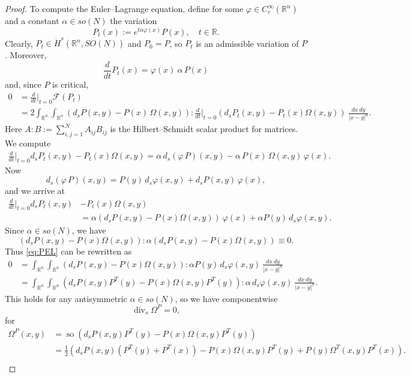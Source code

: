 \documentclass[12pt]{amsart}
\theoremstyle{definition}
\newcommand{\R}{\mathbb{R}}
\newcommand{\brac}[1]{\left (#1 \right )}
\numberwithin{theorem}{section} \numberwithin{equation}{section}
\renewcommand{\div}{\operatorname{div}}
\begin{document}
\begin{proof}
To compute the Euler--Lagrange equation, define for some $\varphi \in C_c^\infty(\R^n)$ and a constant $\alpha \in so(N)$ the variation 
\[
 P_t(x) := e^{t \alpha \varphi(x)} P(x),\quad t \in \R.
\]
Clearly, $P_t \in \dot{H}^s(\R^n,SO(N))$ and $P_0 = P$, so $P_t$ is an admissible variation of $P$. Moreover,
\[
 \frac{d}{dt} P_t(x) = \varphi(x)\ \alpha\, P(x)
\]
and, since $P$ is critical,
\begin{equation}\label{eq:PEL}
\begin{split}
 0 &= \frac{d}{dt} \Big |_{t = 0}  \mathcal{F}(P_t)\\
 &= 2\int_{\R^n}\int_{\R^n} \brac{d_sP(x,y) - P(x)\, \Omega(x,y)}: \frac{d}{dt} \Big|_{t=0}\brac{d_sP_t(x,y) - P_t(x) \Omega(x,y)} \ \frac{dx\ dy}{|x-y|^n}.
\end{split}
 \end{equation}
Here $A:B := \sum_{i,j=1}^N A_{ij}B_{ij}$ is the Hilbert--Schmidt scalar product for matrices. We compute
\[
 \begin{split}
 \frac{d}{dt} \Big|_{t=0} d_sP_t(x,y) - P_t(x) \Omega(x,y)
 =\alpha\, d_s (\varphi\, P)(x,y)-  \alpha\, P(x)\, \Omega(x,y)\, \varphi(x).
 \end{split}
\]
Now
\[
 d_s (\varphi\, P)(x,y)  =  P(y)\, d_s \varphi(x,y)  + d_s P(x,y)\, \varphi(x),
\]
and we arrive at
\[
 \begin{split}
 \frac{d}{dt} \Big|_{t=0} d_s P_t(x,y) &- P_t(x) \Omega(x,y)\\
 &=\alpha \brac{d_s P(x,y) - P(x) \Omega(x,y)}\ \varphi(x) +  \alpha P(y)\, d_s \varphi(x,y).
 \end{split}
\]
Since $\alpha \in so(N)$, we have
\[
 \brac{d_s P(x,y) - P(x) \Omega(x,y)}: \alpha \brac{d_s P(x,y) - P(x) \Omega(x,y)} \equiv 0.
\]
Thus \eqref{eq:PEL} can be rewritten as
\[
\begin{split}
 0 &= \int_{\R^n}\int_{\R^n} \brac{d_sP(x,y) - P(x) \Omega(x,y)}: \alpha P(y)\, d_s \varphi(x,y) \ \frac{dx\ dy}{|x-y|^n}\\
 &= \int_{\R^n}\int_{\R^n} \brac{d_sP(x,y)P^T(y)  - P(x) \Omega(x,y) P^T(y)}: \alpha \, d_s \varphi(x,y) \ \frac{dx\ dy}{|x-y|^n}.
\end{split}
 \]
This holds for any antisymmetric $\alpha \in so(N)$, so we have componentwise
\[
 \div_s \Omega^P = 0,
\]
for 
\[
\begin{split}
 \Omega^P(x,y) &= \operatorname{so}\brac{d_sP(x,y) P^T(y) - P(x) \Omega(x,y) P^T(y)}\\
 &=\frac{1}{2} \brac{d_sP(x,y) \brac{P^T(y) + P^T(x)} - P(x) \Omega(x,y) P^T(y) + P(y) \Omega^T(x,y) P^T(x)}.\\ 
\end{split}
 \]
\end{proof}
\end{document}
